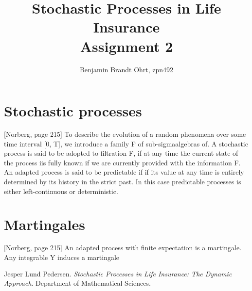 \documentclass[10pt]{article}
\begin{document}
\title{Stochastic Processes in Life Insurance \\
\large Assignment 2}
\author{Benjamin Brandt Ohrt, zpn492}
\maketitle

\section{Stochastic processes}
[Norberg, page 215] To describe the evolution of a random phenomena over some time interval [0, T], we introduce a family F of sub-sigmaalgebras of.
A stochastic process is said to be adopted to filtration F, if at any time the current state of the process iis fully known if we are currently provided with the information F.
An adapted process is said to be predictable if if its value at any time is entirely determined by its history in the strict past. 
In this case predictable processes is either left-continuous or deterministic.

\section{Martingales}
 [Norberg, page 215] An adapted process with finite expectation is a martingale. Any integrable Y induces a martingale

\newpage

\begin{thebibliography}{9}

  Jesper Lund Pedersen.
  \textit{Stochastic Processes in Life Insurance: The Dynamic Approach}.
  Department of Mathematical Sciences.

\end{thebibliography}
\end{document}
